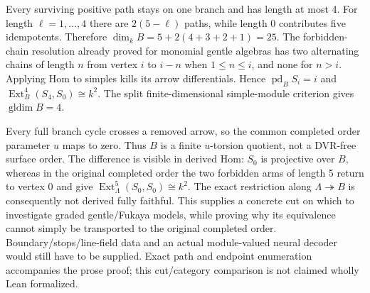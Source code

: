 Every surviving positive path stays on one branch and has length at most 4.
For length $\ell=1,\ldots,4$ there are $2(5-\ell)$ paths, while length 0
contributes five idempotents. Therefore $\dim_kB=5+2(4+3+2+1)=25$.
The forbidden-chain resolution already proved for monomial gentle algebras
has two alternating chains of length $ n $ from vertex $ i $ to $ i-n $ when
$1\le n\le i $, and none for $ n>i $. Applying Hom to simples kills its
arrow differentials. Hence $\operatorname{pd}_B S_i=i $ and
$\operatorname{Ext}^4_B(S_4,S_0)\cong k^2$. The split finite-dimensional
simple-module criterion gives $\operatorname{gldim}B=4$.

Every full branch cycle crosses a removed arrow, so the common completed
order parameter $ u $ maps to zero. Thus $ B $ is a finite $ u $-torsion quotient,
not a DVR-free surface order. The difference is visible in derived Hom:
$ S_0$ is projective over $ B $, whereas in the original completed order the
two forbidden arms of length 5 return to vertex 0 and give
$\operatorname{Ext}^5_\Lambda(S_0,S_0)\cong k^2$. The exact restriction along
$\Lambda\twoheadrightarrow B $ is consequently not derived fully faithful.
This supplies a concrete cut on which to investigate graded gentle/Fukaya
models, while proving why its equivalence cannot simply be transported to
the original completed order. Boundary/stops/line-field data and an actual
module-valued neural decoder would still have to be supplied. Exact path
and endpoint enumeration accompanies the prose proof; this cut/category
comparison is not claimed wholly Lean formalized.
